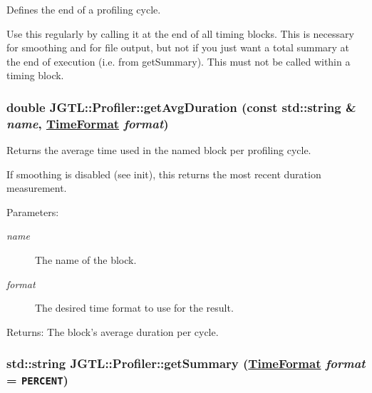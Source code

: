 Defines the end of a profiling cycle.

Use this regularly by calling it at the end of all timing blocks. This is necessary for smoothing and for file output, but not if you just want a total summary at the end of execution (i.e. from get\-Summary). This must not be called within a timing block. \hypertarget{class_j_g_t_l_1_1_profiler_a9e80cbb87225309047515205386270a}{
\subsubsection[getAvgDuration]{\setlength{\rightskip}{0pt plus 5cm}double JGTL::Profiler::get\-Avg\-Duration (const std::string \& {\em name}, \hyperlink{namespace_j_g_t_l_11a34d88ecadd1c99354adc21fd5abe6}{Time\-Format} {\em format})}}
\label{class_j_g_t_l_1_1_profiler_a9e80cbb87225309047515205386270a}


Returns the average time used in the named block per profiling cycle.

If smoothing is disabled (see init), this returns the most recent duration measurement.

\begin{Desc}
\item[Parameters:]
\begin{description}
\item[{\em name}]The name of the block. \item[{\em format}]The desired time format to use for the result. \end{description}
\end{Desc}
\begin{Desc}
\item[Returns:]The block's average duration per cycle. \end{Desc}
\hypertarget{class_j_g_t_l_1_1_profiler_b168b01e49b5ec112e13a1673ee56fd9}{
\subsubsection[getSummary]{\setlength{\rightskip}{0pt plus 5cm}std::string JGTL::Profiler::get\-Summary (\hyperlink{namespace_j_g_t_l_11a34d88ecadd1c99354adc21fd5abe6}{Time\-Format} {\em format} = {\tt PERCENT})}}
\label{class_j_g_t_l_1_1_profiler_b168b01e49b5ec112e13a1673ee56fd9}


